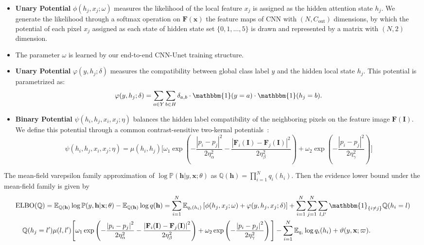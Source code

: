 \documentclass[10pt]{article}
\newcommand{\EE}{{\mathbb{E}}}
\newcommand{\PP}{{\mathbb{P}}}
\newcommand{\QQ}{{\mathbb{Q}}}
\newcommand{\Fb}{\mathbf{F}}
\newcommand{\Ib}{\mathbf{I}}
\newcommand{\hb}{\mathbf{h}}
\newcommand{\xb}{\mathbf{x}}
\newcommand{\one}{\mathbbm{1}}
\begin{document}
\begin{itemize}
\item \textbf{Unary Potential}
$\phi(h_j, x_j; \omega)$ measures the likelihood of the local feature
$x_j$ is assigned as the hidden attention state $h_j$.
We generate the likelihood through a softmax operation on $\Fb(\xb)$
the feature maps of CNN with $(N, C_{\textrm{out}})$ dimensions,
by which the potential of each pixel $x_j$ assigned as each state of
hidden state set $\{0, 1, \dots, 5\}$
is drawn and represented by a matrix with $(N, 2)$ dimension.
\item The parameter $\omega$ is learned by our end-to-end CNN-Unet
training structure.
\item \textbf{Unary Potential} $\varphi(y, h_j; \delta)$ measures
the compatibility between global class label $y$ and the hidden local
state $h_j$. This potential is parametrized as:
\begin{align*}
\varphi(y, h_{j}; \delta) = \sum_{a \in Y} \sum_{b \in H} \delta_{a, b}
\cdot \one(y = a) \cdot \one(h_j = b).
\end{align*}
\item \textbf{Binary Potential} $\psi(h_i, h_j, x_i, x_j; \eta)$
balances the hidden label compatibility of the neighboring pixels on the 
feature image $\Fb(\Ib)$.
We define this potential through a common contrast-sensitive two-kernal 
potentials~\citep{krahenbuhl2011efficient,chen2022end}:
\begin{equation*}
\psi(h_i, h_j, x_i, x_j; \eta) = \mu(h_i, h_j) \Bigg[
\omega_1 \exp \left(
-\frac{\left\lvert p_i - p_j \right\rvert^2}{2\eta_\alpha^2}
-\frac{\left\lvert \Fb_i(\Ib) - \Fb_j(\Ib) \right\rvert^2}{2\eta_\beta^2} 
\right) + \omega_2 \exp \left(
- \frac{\left\lvert p_i - p_j \right\rvert^2}{2 \eta_\gamma^2}
\right)
\Bigg]
\end{equation*}
\end{itemize}


The mean-field varepsilon family approximation of
$\log\PP(\hb \vert y, \xb; \theta)$ as $\QQ(\hb) = \prod_{i=1}^N q_i(h_i)$.
Then the evidence lower bound under the mean-field family is given by
\begin{equation*}
\begin{split}
& \textrm{ELBO}(\QQ) = \EE_{\QQ(\hb)} \log\PP(y, \hb \vert \xb; \theta)
- \EE_{\QQ(\hb)} \log q(\hb) = \sum_{i=1}^N \EE_{q_i(h_i)}
\left[ \phi(h_j, x_j; \omega) + \varphi(y, h_j, x_j; \delta) \right]
+ \sum_{i=1}^N \sum_{j=1}^N \sum_{l,l^\prime} \one_{\{i \neq j\}}\QQ(h_i = l) \\
&\quad \QQ(h_j = l^\prime) \mu(l, l^\prime)
\Bigg[ \omega_1 \exp \left(
- \frac{\left\lvert p_i - p_j \right\rvert^2}{2\eta_\alpha^2}
- \frac{\left\lvert \Fb_i(\Ib) - \Fb_j(\Ib) \right\rvert^2}{2\eta_\beta^2}
\right)
+ \omega_2 \exp \left(
- \frac{\left\lvert p_i - p_j \right\rvert^2}{2\eta_\gamma^2}
\right) \Bigg]
- \sum_{i=1}^N \EE_{q_i} \log q_i(h_i) + \vartheta(y, \xb; \varpi).
\end{split}
\end{equation*}
\end{document}
